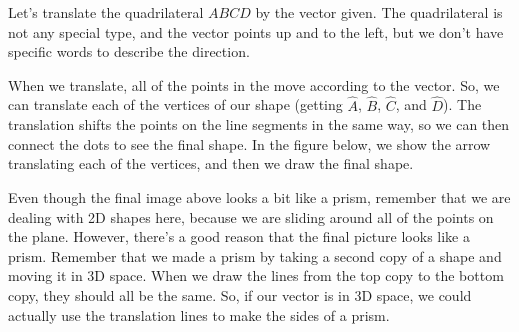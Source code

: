 \documentclass{ximera}
\begin{document}
\begin{example}
Let's translate the quadrilateral $ABCD$ by the vector given. The quadrilateral is not any special type, and the vector points up and to the left, but we don't have specific words to describe the direction.
\begin{image}
\end{image}
When we translate, all of the points in the  move according to the vector. So, we can translate each of the vertices of our shape (getting $\hat{A}$, $\hat{B}$, $\hat{C}$, and $\hat{D}$). The translation shifts the points on the line segments in the same way, so we can then connect the dots to see the final shape. In the figure below, we show the arrow translating each of the vertices, and then we draw the final shape.
\begin{image}
\end{image}

\end{example}
Even though the final image above looks a bit like a prism, remember that we are dealing with 2D shapes here, because we are sliding around all of the points on the plane. However, there's a good reason that the final picture looks like a prism. Remember that we made a prism by taking a second copy of a shape and moving it in 3D space. When we draw the lines from the top copy to the bottom copy, they should all be the same. So, if our vector is in 3D space, we could actually use the translation lines to make the sides of a prism.
\end{document}
